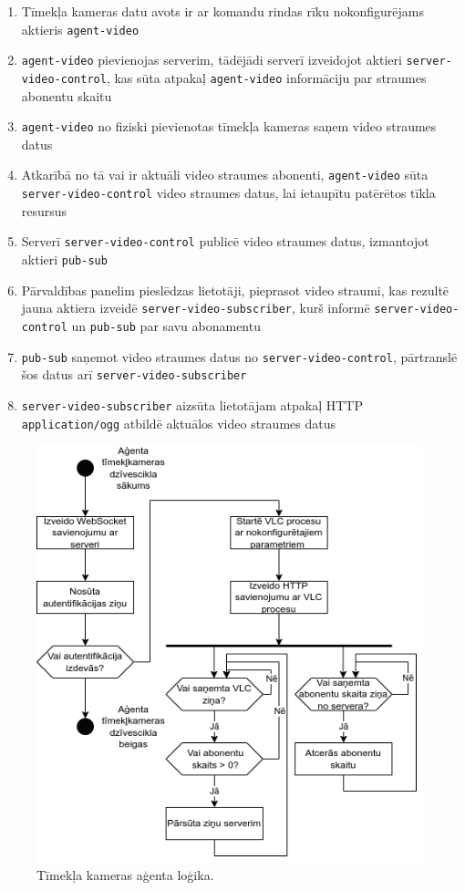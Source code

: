 \begin{enumerate}
    \item Tīmekļa kameras datu avots ir ar komandu rindas rīku nokonfigurējams
        aktieris \lstinline!agent-video!
    \item \lstinline!agent-video! pievienojas serverim, tādējādi serverī
        izveidojot aktieri \lstinline!server-video-control!, kas sūta atpakaļ
        \lstinline!agent-video! informāciju par straumes abonentu skaitu
    \item \lstinline!agent-video! no fiziski pievienotas tīmekļa kameras saņem
        video straumes datus
    \item Atkarībā no tā vai ir aktuāli video straumes abonenti,
        \lstinline!agent-video! sūta \lstinline!server-video-control! video
        straumes datus, lai ietaupītu patērētos tīkla resursus
    \item Serverī \lstinline!server-video-control! publicē video straumes datus,
        izmantojot aktieri \lstinline!pub-sub!
    \item Pārvaldības panelim pieslēdzas lietotāji, pieprasot video straumi, kas
        rezultē jauna aktiera izveidē \lstinline!server-video-subscriber!, kurš
        informē \lstinline!server-video-control! un \lstinline!pub-sub! par savu
        abonamentu
    \item \lstinline!pub-sub! saņemot video straumes datus no
        \lstinline!server-video-control!, pārtranslē šos datus arī
        \lstinline!server-video-subscriber!
    \item \lstinline!server-video-subscriber! aizsūta lietotājam atpakaļ HTTP
        \lstinline!application/ogg! atbildē aktuālos video straumes datus
\end{enumerate}

\begin{figure}[H]
    \includegraphics[width=0.6\linewidth]{assets/video_engine.drawio.png}
    \centering
    \caption{Tīmekļa kameras aģenta loģika.}
    \label{fig:videoengine}
\end{figure}


